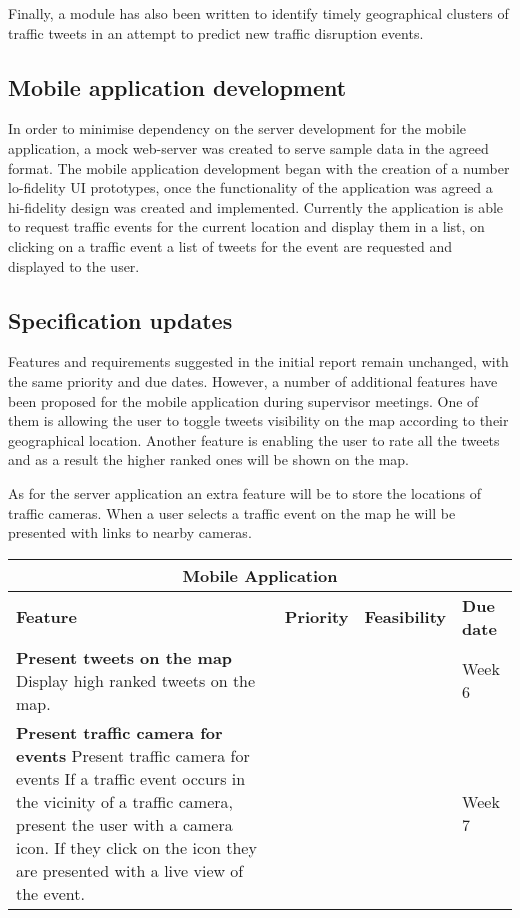 Finally, a module has also been written to identify timely geographical
clusters of traffic tweets in an attempt to predict new traffic disruption
events. 


\subsection{Mobile application development}

In order to minimise dependency on the server development for the mobile
application, a  mock web-server was created to serve sample data in the agreed
format. The mobile application development began with the creation of a number
lo-fidelity UI prototypes, once the functionality of the application was agreed
a hi-fidelity design was created and implemented. Currently the application is
able to request traffic events for the current location and display them in a
list, on clicking on a traffic event a list of tweets for the event are
requested and displayed to the user. 

\subsection{Specification updates}

Features and requirements suggested in the initial report remain unchanged,
with the same priority and due dates. However, a number of additional features
have been proposed for the mobile application during supervisor meetings. One
of them is allowing the user to toggle tweets visibility on the map according
to their geographical location. Another feature is enabling the user to rate
all the tweets and as a result the higher ranked ones will be shown on the map.

As for the server application an extra feature will be to store the locations
of traffic cameras. When a user selects a traffic event on the map he will be
presented with links to nearby cameras.


\begin{center}
\begin{tabular}{ | p{9cm} | c | c | p{1.8cm} | }
\hline
\multicolumn{4}{|c|}{\textbf{Mobile Application}} \\ \hline
\textbf{Feature} & \textbf{Priority} & \textbf{Feasibility} & \textbf{Due date}
\\ \hline
\textbf{Present tweets on the map}\newline
Display high ranked tweets on the map. & & & Week 6 \\ \hline
\textbf{Present traffic camera for events}\newline
Present traffic camera for events
If a traffic event occurs in the vicinity of a traffic camera, present the user
with a camera icon. If they click on the icon they are presented with a live
view of the event. &  &  & Week 7 \\ \hline
\end{tabular}
\end{center}

